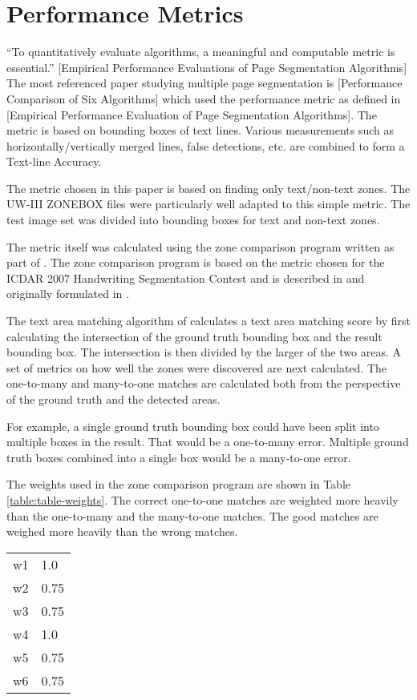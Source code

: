 \documentclass[conference]{IEEEtran}
\begin{document}
%
%
\section{Performance Metrics}
``To quantitatively evaluate algorithms, a meaningful and computable metric is
essential.'' [Empirical Performance Evaluations of Page Segmentation Algorithms]
The most referenced paper studying multiple page segmentation is [Performance
Comparison of Six Algorithms] which used the performance metric as defined in
[Empirical Performance Evaluation of Page Segmentation Algorithms]. The metric
is based on bounding boxes of text lines. Various measurements such as
horizontally/vertically merged lines, false detections, etc. are combined to
form a Text-line Accuracy.

The metric chosen in this paper is based on finding only text/non-text zones.
The UW-III ZONEBOX files were particularly well adapted to this simple
metric. The \cite{IEEEhowto:Winder} test image set was divided into bounding boxes for text
and non-text zones. 

The metric itself was calculated using the zone comparison program written as
part of \cite{IEEEhowto:Winder}. The zone comparison program is based on the
metric chosen for the ICDAR 2007 Handwriting Segmentation Contest and is
described in \cite{IEEEhowto:Gatos} and originally formulated in
\cite{IEEEhowto:Philips}. 

The text area matching algorithm of \cite{IEEEhowto:Philips} calculates a
text area matching score by first calculating the intersection of the ground
truth bounding box and the result bounding box. The intersection is
then divided by the larger of the two areas. A set of metrics on how well the
zones were discovered are next calculated.  The one-to-many and many-to-one
matches are calculated both from the perspective of the ground truth and the
detected areas. 

For example, a single ground truth bounding box could have been split into
multiple boxes in the result. That would be a one-to-many error. Multiple
ground truth boxes combined into a single box would be a many-to-one error.

The weights used in the zone comparison program are shown in Table
\ref{table:table-weights}. The
correct one-to-one matches are weighted more heavily than the one-to-many and
the many-to-one matches. The good matches are weighed more heavily than the
wrong matches.

\begin{tabular}{|r|l|}
\hline
    w1 & 1.0  \\
    w2 & 0.75 \\
    w3 & 0.75 \\
    w4 & 1.0  \\
    w5 & 0.75 \\
    w6 & 0.75 \\
\hline
\end{tabular}
\label{table:table-weights}
\end{document}
